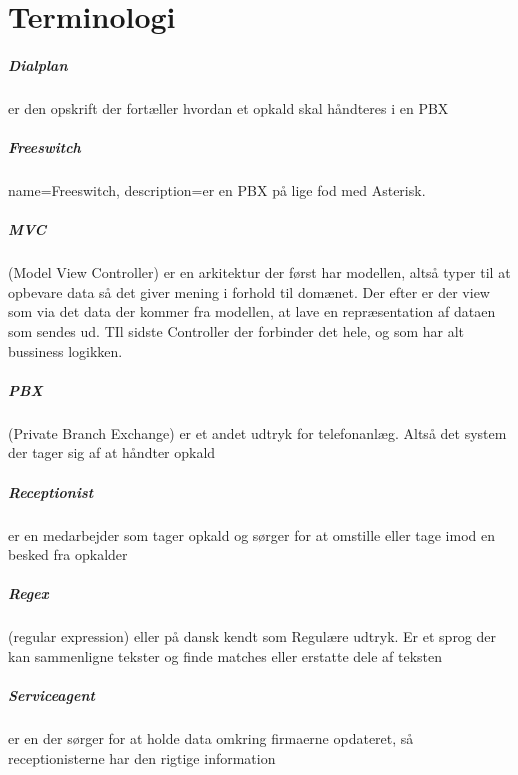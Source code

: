 \chapter{Terminologi}

\paragraph{Dialplan} er den opskrift der fortæller hvordan et opkald skal håndteres i en PBX

\paragraph{Freeswitch}
{
  name=Freeswitch,
  description={er en PBX på lige fod med Asterisk.}
}

\paragraph{MVC} (Model View Controller) er en arkitektur der først har modellen, altså typer til at opbevare data så det giver mening i forhold til domænet. Der efter er der view som via det data der kommer fra modellen, at lave en repræsentation af dataen som sendes ud. TIl sidste Controller der forbinder det hele, og som har alt bussiness logikken.

\paragraph{PBX} (Private Branch Exchange) er et andet udtryk for telefonanlæg. Altså det system der tager sig af at håndter opkald

\paragraph{Receptionist} er en medarbejder som tager opkald og sørger for at omstille eller tage imod en besked fra opkalder

\paragraph{Regex} (regular expression) eller på dansk kendt som Regulære udtryk. Er et sprog der kan sammenligne tekster og finde matches eller erstatte dele af teksten

\paragraph{Serviceagent} er en der sørger for at holde data omkring firmaerne opdateret, så receptionisterne har den rigtige information

